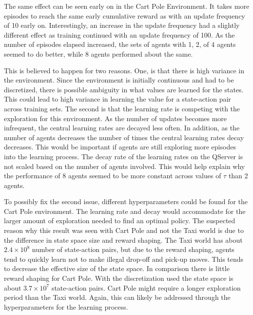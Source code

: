 \documentclass[jair,twoside,11pt,theapa]{article}
\begin{document}
The same effect can be seen early on in the Cart Pole Environment. It takes more episodes to reach the same early cumulative reward as with an update frequency of 10 early on. Interestingly, an increase in the update frequency had a slightly different effect as training continued with an update frequency of 100. As the number of episodes elapsed increased, the sets of agents with 1, 2, of 4 agents seemed to do better, while 8 agents performed about the same. 

This is believed to happen for two reasons. One, is that there is high variance in the environment. Since the environment is initially continuous and had to be discretized, there is possible ambiguity in what values are learned for the states. This could lead to high variance in learning the value for a state-action pair across training sets. The second is that the learning rate is competing with the exploration for this environment. As the number of updates becomes more infrequent, the central learning rates are decayed less often. In addition, as the number of agents decreases the number of times the central learning rates decay decreases. This would be important if agents are still exploring more episodes into the learning process. The decay rate of the learning rates on the QServer is not scaled based on the number of agents involved. This would help explain why the performance of 8 agents seemed to be more constant across values of $\tau$ than 2 agents.

To possibly fix the second issue, different hyperparameters could be found for the Cart Pole environment. The learning rate and decay would accommodate for the larger amount of exploration needed to find an optimal policy. The suspected reason why this result was seen with Cart Pole and not the Taxi world is due to the difference in state space size and reward shaping. The Taxi world has about  $2.4 \times 10^8$ number of state-action pairs, but due to the reward shaping, agents tend to quickly learn not to make illegal drop-off and pick-up moves. This tends to decrease the effective size of the state space. In comparison there is little reward shaping for Cart Pole. With the discretization used the state space is about  $3.7 \times 10^7$ state-action pairs. Cart Pole might require a longer exploration period than the Taxi world. Again, this can likely be addressed through the hyperparameters for the learning process. 


\iffalse
\end{document}

